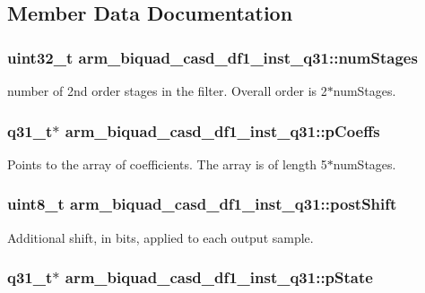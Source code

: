 \subsection{Member Data Documentation}
\hypertarget{structarm__biquad__casd__df1__inst__q31_a2c2b579f1df1d8273a5d9d945c27e1b2}{
\subsubsection[{num\-Stages}]{\setlength{\rightskip}{0pt plus 5cm}uint32\-\_\-t arm\-\_\-biquad\-\_\-casd\-\_\-df1\-\_\-inst\-\_\-q31\-::num\-Stages}}\label{structarm__biquad__casd__df1__inst__q31_a2c2b579f1df1d8273a5d9d945c27e1b2}
number of 2nd order stages in the filter. Overall order is 2$\ast$num\-Stages. \hypertarget{structarm__biquad__casd__df1__inst__q31_aa62366c632f3b5305086f841f079dbd2}{
\subsubsection[{p\-Coeffs}]{\setlength{\rightskip}{0pt plus 5cm}q31\-\_\-t$\ast$ arm\-\_\-biquad\-\_\-casd\-\_\-df1\-\_\-inst\-\_\-q31\-::p\-Coeffs}}\label{structarm__biquad__casd__df1__inst__q31_aa62366c632f3b5305086f841f079dbd2}
Points to the array of coefficients. The array is of length 5$\ast$num\-Stages. \hypertarget{structarm__biquad__casd__df1__inst__q31_a636c7fbe09ec4bef0bc0a4b4e2151cbe}{
\subsubsection[{post\-Shift}]{\setlength{\rightskip}{0pt plus 5cm}uint8\-\_\-t arm\-\_\-biquad\-\_\-casd\-\_\-df1\-\_\-inst\-\_\-q31\-::post\-Shift}}\label{structarm__biquad__casd__df1__inst__q31_a636c7fbe09ec4bef0bc0a4b4e2151cbe}
Additional shift, in bits, applied to each output sample. \hypertarget{structarm__biquad__casd__df1__inst__q31_a5dcf4727f58eb4e8e8b392508d8657bb}{
\subsubsection[{p\-State}]{\setlength{\rightskip}{0pt plus 5cm}q31\-\_\-t$\ast$ arm\-\_\-biquad\-\_\-casd\-\_\-df1\-\_\-inst\-\_\-q31\-::p\-State}}\label{structarm__biquad__casd__df1__inst__q31_a5dcf4727f58eb4e8e8b392508d8657bb}
